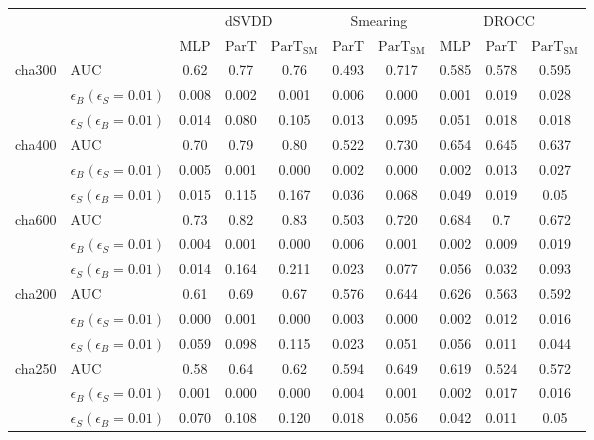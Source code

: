 \begin{table}[H]
    \centering
    \setlength{\tabcolsep}{4pt}
    \begin{tabular}{ll|ccc|cc|ccc}
    \hline
    \multicolumn{2}{c|}{} & \multicolumn{3}{c|}{dSVDD} & \multicolumn{2}{c|}{Smearing} & \multicolumn{3}{c}{DROCC}  \\
     & & MLP & ParT & $\text{ParT}_{\text{SM}}$ & ParT & $\text{ParT}_{\text{SM}}$ & MLP & ParT & $\text{ParT}_{\text{SM}}$ \\
    \hline \hline
    \multirow{3}{*}{cha300} & AUC & 0.62 & 0.77 & 0.76 & 0.493 & 0.717 & 0.585 & 0.578 & 0.595 \\
    & $\epsilon_B(\epsilon_S=0.01)$ & 0.008 & 0.002 & 0.001 & 0.006 & 0.000 & 0.001 & 0.019 & 0.028 \\
    & $\epsilon_S(\epsilon_B=0.01)$ & 0.014 & 0.080 & 0.105 & 0.013 & 0.095 & 0.051 & 0.018 & 0.018 \\
    \hline
    \multirow{3}{*}{cha400} & AUC & 0.70 & 0.79 & 0.80 & 0.522 & 0.730 & 0.654 & 0.645 & 0.637 \\
    & $\epsilon_B(\epsilon_S=0.01)$ & 0.005 & 0.001 & 0.000 & 0.002 & 0.000 & 0.002 & 0.013 & 0.027 \\
    & $\epsilon_S(\epsilon_B=0.01)$ & 0.015 & 0.115 & 0.167 & 0.036 & 0.068 & 0.049 & 0.019 & 0.05 \\
    \hline 
    \multirow{3}{*}{cha600} & AUC & 0.73 & 0.82 & 0.83 & 0.503 & 0.720 & 0.684 & 0.7 & 0.672 \\
    & $\epsilon_B(\epsilon_S=0.01)$ & 0.004 & 0.001 & 0.000 & 0.006 & 0.001 & 0.002 & 0.009 & 0.019 \\
    & $\epsilon_S(\epsilon_B=0.01)$ & 0.014 & 0.164 & 0.211 & 0.023 & 0.077 & 0.056 & 0.032 & 0.093 \\
    \hline
    \multirow{3}{*}{cha200} & AUC & 0.61 & 0.69 & 0.67 & 0.576 & 0.644 & 0.626 & 0.563 & 0.592 \\
    & $\epsilon_B(\epsilon_S=0.01)$ & 0.000 & 0.001 & 0.000 & 0.003 & 0.000 & 0.002 & 0.012 & 0.016 \\
    & $\epsilon_S(\epsilon_B=0.01)$ & 0.059 & 0.098 & 0.115 & 0.023 & 0.051 & 0.056 & 0.011 & 0.044 \\
    \hline  
    \multirow{3}{*}{cha250} & AUC & 0.58 & 0.64 & 0.62 & 0.594 & 0.649 & 0.619 & 0.524 & 0.572 \\
    & $\epsilon_B(\epsilon_S=0.01)$ & 0.001 & 0.000 & 0.000 & 0.004 & 0.001 & 0.002 & 0.017 & 0.016 \\
    & $\epsilon_S(\epsilon_B=0.01)$ & 0.070 & 0.108 & 0.120 & 0.018 & 0.056 & 0.042 & 0.011 & 0.05 \\

\end{tabular}
\end{table}

